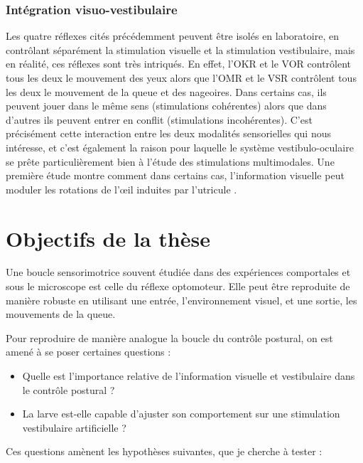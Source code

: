 \subsubsection{Intégration visuo-vestibulaire}

Les quatre réflexes cités précédemment peuvent être isolés en laboratoire, en contrôlant séparément la stimulation visuelle et la stimulation vestibulaire, mais en réalité, ces réflexes sont très intriqués. En effet, l'OKR et le VOR contrôlent tous les deux le mouvement des yeux alors que l'OMR et le VSR contrôlent tous les deux le mouvement de la queue et des nageoires. Dans certains cas, ils peuvent jouer dans le même sens (stimulations cohérentes) alors que dans d'autres ils peuvent entrer en conflit (stimulations incohérentes). C'est précisément cette interaction entre les deux modalités sensorielles qui nous intéresse, et c'est également la raison pour laquelle le système vestibulo-oculaire se prête particulièrement bien à l'étude des stimulations multimodales. Une première étude montre comment dans certains cas, l'information visuelle peut moduler les rotations de l'œil induites par l'utricule \cite{bianco_tangential_2012}.


\section{Objectifs de la thèse}


Une boucle sensorimotrice souvent étudiée dans des expériences comportales et sous le microscope est celle du réflexe optomoteur. Elle peut être reproduite de manière robuste en utilisant une entrée, l'environnement visuel, et une sortie, les mouvements de la queue. 

Pour reproduire de manière analogue la boucle du contrôle postural, on est amené à se poser certaines questions : 

\begin{itemize}
  \item Quelle est l'importance relative de l'information visuelle et vestibulaire dans le contrôle postural ?
  \item La larve est-elle capable d'ajuster son comportement sur une stimulation vestibulaire artificielle ?
\end{itemize}

Ces questions amènent les hypothèses suivantes, que je cherche à tester :

